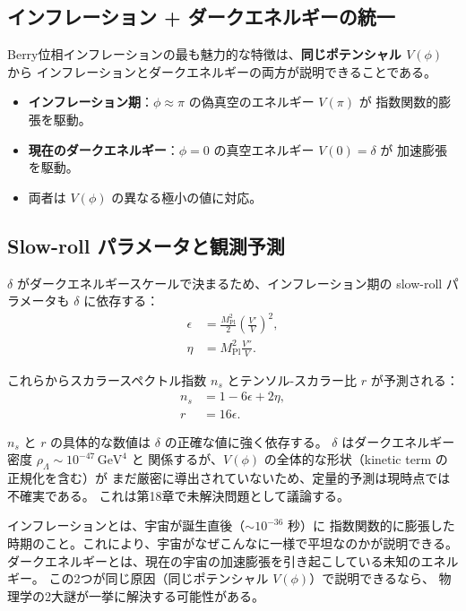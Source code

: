 \subsection{インフレーション + ダークエネルギーの統一}

Berry位相インフレーションの最も魅力的な特徴は、\textbf{同じポテンシャル $V(\phi)$} から
インフレーションとダークエネルギーの両方が説明できることである。

\begin{keyresult}[同一ポテンシャルからの二重説明]
\begin{itemize}
  \item \textbf{インフレーション期}：$\phi \approx \pi$ の偽真空のエネルギー $V(\pi)$ が
        指数関数的膨張を駆動。
  \item \textbf{現在のダークエネルギー}：$\phi = 0$ の真空エネルギー $V(0) = \delta$ が
        加速膨張を駆動。
  \item 両者は $V(\phi)$ の異なる極小の値に対応。
\end{itemize}
\end{keyresult}

\subsection{Slow-roll パラメータと観測予測}

$\delta$ がダークエネルギースケールで決まるため、インフレーション期の
slow-roll パラメータも $\delta$ に依存する：
\begin{align}
  \epsilon &= \frac{M_{\mathrm{Pl}}^2}{2}\left(\frac{V'}{V}\right)^2, \\
  \eta &= M_{\mathrm{Pl}}^2 \frac{V''}{V}.
\end{align}

これらからスカラースペクトル指数 $n_s$ とテンソル-スカラー比 $r$ が予測される：
\begin{align}
  n_s &= 1 - 6\epsilon + 2\eta, \\
  r &= 16\epsilon.
\end{align}

\begin{warningbox}
$n_s$ と $r$ の具体的な数値は $\delta$ の正確な値に強く依存する。
$\delta$ はダークエネルギー密度 $\rho_\Lambda \sim 10^{-47}\,\mathrm{GeV}^4$ と
関係するが、$V(\phi)$ の全体的な形状（kinetic term の正規化を含む）が
まだ厳密に導出されていないため、定量的予測は現時点では不確実である。
これは第18章で未解決問題として議論する。
\end{warningbox}

\begin{hsbox}
インフレーションとは、宇宙が誕生直後（$\sim 10^{-36}$ 秒）に
指数関数的に膨張した時期のこと。これにより、宇宙がなぜこんなに一様で平坦なのかが説明できる。
ダークエネルギーとは、現在の宇宙の加速膨張を引き起こしている未知のエネルギー。
この2つが同じ原因（同じポテンシャル $V(\phi)$）で説明できるなら、
物理学の2大謎が一挙に解決する可能性がある。
\end{hsbox}
